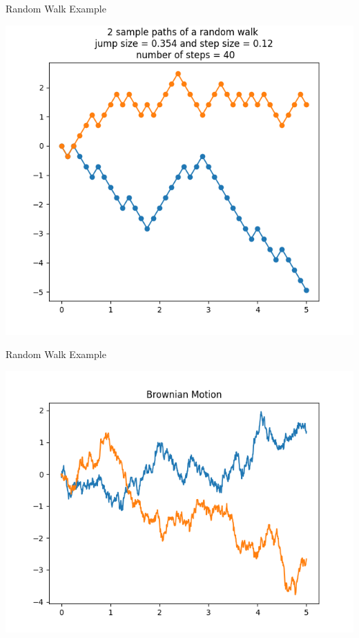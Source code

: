 \documentclass{beamer}%
\numberwithin{equation}{section}
\begin{document}
	\begin{frame}{Random Walk Example}
		\begin{center}
			\includegraphics[scale=.6]{randomwalk40steps.png}
		\end{center}
	\end{frame}
	
	
	\begin{frame}{Random Walk Example}
		\begin{center}
			\includegraphics[scale=.7]{BrownianMotion.png}
		\end{center}
	\end{frame}
	
\end{document}
